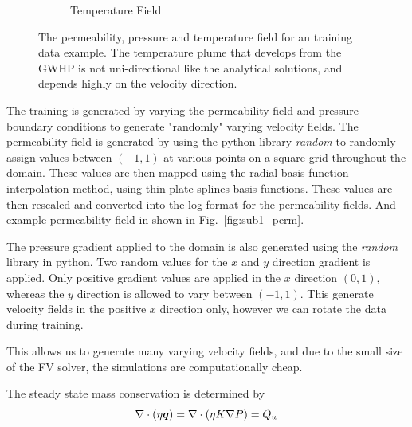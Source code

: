 \documentclass{article} %
\begin{document}
\begin{figure}
\begin{subfigure}{.33\textwidth}
  \caption{Temperature Field}
  \label{fig:sub1_temp}
\end{subfigure}%
\caption{The permeability, pressure and temperature field for an training data example. The temperature plume that develops from the GWHP is not uni-directional like the analytical solutions, and depends highly on the velocity direction.}
\label{fig:test}
\end{figure}




The training is generated by varying the permeability field and pressure boundary conditions to generate "randomly" varying velocity fields. The permeability field is generated by using the python library \textit{random} to randomly assign values between $(-1 , 1)$ at various points on a square grid throughout the domain. These values are then mapped using the radial basis function interpolation method, using thin-plate-splines basis functions. These values are then rescaled and converted into the log format for the permeability fields. And example permeability field in shown in Fig.~\ref{fig:sub1_perm}.

The pressure gradient applied to the domain is also generated using the \textit{random} library in python. Two random values for the $x$ and $y$ direction gradient is applied. Only positive gradient values are applied in the $x$ direction $(0 , 1)$, whereas the $y$ direction is allowed to vary between $(-1 , 1)$. This generate velocity fields in the positive $x$ direction only, however we can rotate the data during training. 

This allows us to generate many varying velocity fields, and due to the small size of the FV solver, the simulations are computationally cheap.






The steady state mass conservation is determined by 
\begin{equation}
   \label{eq:mass}
   \nabla \cdot \left(\eta {\bm{q}} \right) =  \nabla \cdot \left(\eta  K \nabla P  \right) = Q_w
\end{equation}
\end{document}
